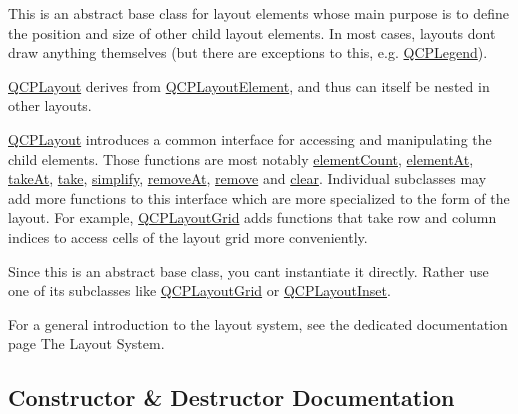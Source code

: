 This is an abstract base class for layout elements whose main purpose is to define the position and size of other child layout elements. In most cases, layouts don\textquotesingle{}t draw anything themselves (but there are exceptions to this, e.\+g. \mbox{\hyperlink{class_q_c_p_legend}{Q\+C\+P\+Legend}}).

\mbox{\hyperlink{class_q_c_p_layout}{Q\+C\+P\+Layout}} derives from \mbox{\hyperlink{class_q_c_p_layout_element}{Q\+C\+P\+Layout\+Element}}, and thus can itself be nested in other layouts.

\mbox{\hyperlink{class_q_c_p_layout}{Q\+C\+P\+Layout}} introduces a common interface for accessing and manipulating the child elements. Those functions are most notably \mbox{\hyperlink{class_q_c_p_layout_a39d3e9ef5d9b82ab1885ba1cb9597e56}{element\+Count}}, \mbox{\hyperlink{class_q_c_p_layout_afa73ca7d859f8a3ee5c73c9b353d2a56}{element\+At}}, \mbox{\hyperlink{class_q_c_p_layout_a5a79621fa0a6eabb8b520cfc04fb601a}{take\+At}}, \mbox{\hyperlink{class_q_c_p_layout_ada26cd17e56472b0b4d7fbbc96873e4c}{take}}, \mbox{\hyperlink{class_q_c_p_layout_a41e6ac049143866e8f8b4964efab01b2}{simplify}}, \mbox{\hyperlink{class_q_c_p_layout_a2403f684fee3ce47132faaeed00bb066}{remove\+At}}, \mbox{\hyperlink{class_q_c_p_layout_a6c58f537d8086f352576ab7c5b15d0bc}{remove}} and \mbox{\hyperlink{class_q_c_p_layout_a02883bdf2769b5b227f0232dba1ac4ee}{clear}}. Individual subclasses may add more functions to this interface which are more specialized to the form of the layout. For example, \mbox{\hyperlink{class_q_c_p_layout_grid}{Q\+C\+P\+Layout\+Grid}} adds functions that take row and column indices to access cells of the layout grid more conveniently.

Since this is an abstract base class, you can\textquotesingle{}t instantiate it directly. Rather use one of its subclasses like \mbox{\hyperlink{class_q_c_p_layout_grid}{Q\+C\+P\+Layout\+Grid}} or \mbox{\hyperlink{class_q_c_p_layout_inset}{Q\+C\+P\+Layout\+Inset}}.

For a general introduction to the layout system, see the dedicated documentation page The Layout System. 

\subsection{Constructor \& Destructor Documentation}
\mbox{\label{class_q_c_p_layout_a04222e6e1361fd802d48f1a25b7020d4}} 
